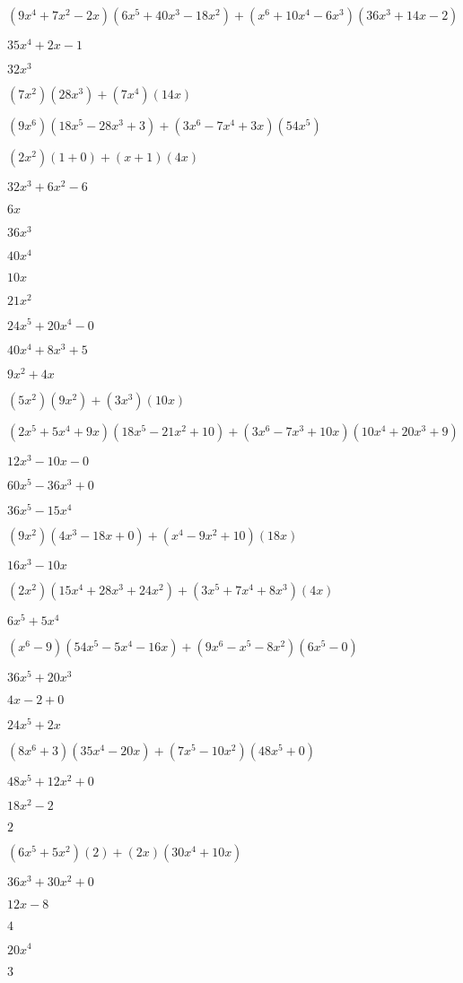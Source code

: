 \documentclass{article}
\begin{document}
\begin{multicols}{2}
$(9x^{4}+7x^2-2x)(6x^{5}+40x^{3}-18x^{2})+(x^{6}+10x^{4}-6x^{3})(36x^{3}+14x-2)$\item $35x^{4}+2x-1$\item $32x^{3}$\item $(7x^2)(28x^{3})+(7x^{4})(14x)$\item $(9x^{6})(18x^{5}-28x^{3}+3)+(3x^{6}-7x^{4}+3x)(54x^{5})$\item $(2x^2)(1+0)+(x+1)(4x)$\item $32x^{3}+6x^{2}-6$\item $6x$\item $36x^{3}$\item $40x^{4}$\item $10x$\item $21x^{2}$\item $24x^{5}+20x^{4}-0$\item $40x^{4}+8x^{3}+5$\item $9x^{2}+4x$\item $(5x^2)(9x^{2})+(3x^{3})(10x)$\item $(2x^{5}+5x^{4}+9x)(18x^{5}-21x^{2}+10)+(3x^{6}-7x^{3}+10x)(10x^{4}+20x^{3}+9)$\item $12x^{3}-10x-0$\item $60x^{5}-36x^{3}+0$\item $36x^{5}-15x^{4}$\item $(9x^2)(4x^{3}-18x+0)+(x^{4}-9x^2+10)(18x)$\item $16x^{3}-10x$\item $(2x^2)(15x^{4}+28x^{3}+24x^{2})+(3x^{5}+7x^{4}+8x^{3})(4x)$\item $6x^{5}+5x^{4}$\item $(x^{6}-9)(54x^{5}-5x^{4}-16x)+(9x^{6}-x^{5}-8x^2)(6x^{5}-0)$\item $36x^{5}+20x^{3}$\item $4x-2+0$\item $24x^{5}+2x$\item $(8x^{6}+3)(35x^{4}-20x)+(7x^{5}-10x^2)(48x^{5}+0)$\item $48x^{5}+12x^{2}+0$\item $18x^{2}-2$\item $2$\item $(6x^{5}+5x^2)(2)+(2x)(30x^{4}+10x)$\item $36x^{3}+30x^{2}+0$\item $12x-8$\item $4$\item $20x^{4}$\item $3$\item 
\end{multicols}
\end{document}
